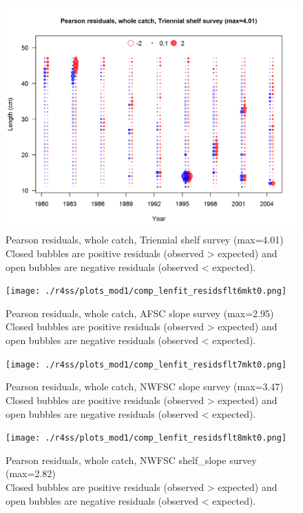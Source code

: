 \documentclass[12pt,]{article}
\begin{document}
\begin{figure}
\centering
\includegraphics{./r4ss/plots_mod1/comp_lenfit_residsflt5mkt0.png}
\caption{Pearson residuals, whole catch, Triennial shelf survey
(max=4.01)\\
Closed bubbles are positive residuals (observed \textgreater{} expected)
and open bubbles are negative residuals (observed \textless{} expected).
\label{fig:tri_len_pearson}}
\end{figure}

\begin{figure}
\centering
\texttt{[image: ./r4ss/plots\_mod1/comp\_lenfit\_residsflt6mkt0.png]}
\caption{Pearson residuals, whole catch, AFSC slope survey (max=2.95)\\
Closed bubbles are positive residuals (observed \textgreater{} expected)
and open bubbles are negative residuals (observed \textless{} expected).
\label{fig:afsc_len_pearson}}
\end{figure}

\begin{figure}
\centering
\texttt{[image: ./r4ss/plots\_mod1/comp\_lenfit\_residsflt7mkt0.png]}
\caption{Pearson residuals, whole catch, NWFSC slope survey (max=3.47)\\
Closed bubbles are positive residuals (observed \textgreater{} expected)
and open bubbles are negative residuals (observed \textless{} expected).
\label{fig:nwfsc_len_pearson}}
\end{figure}

\begin{figure}
\centering
\texttt{[image: ./r4ss/plots\_mod1/comp\_lenfit\_residsflt8mkt0.png]}
\caption{Pearson residuals, whole catch, NWFSC shelf\_slope survey
(max=2.82)\\
Closed bubbles are positive residuals (observed \textgreater{} expected)
and open bubbles are negative residuals (observed \textless{} expected).
\label{fig:nwfsc_combo_len_pearson}}
\end{figure}
\end{document}
